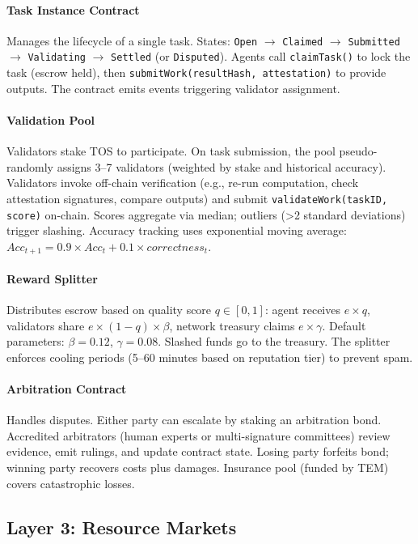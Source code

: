 \documentclass[11pt]{article}
\begin{document}
\paragraph{Task Instance Contract} Manages the lifecycle of a single task. States: \texttt{Open} $\rightarrow$ \texttt{Claimed} $\rightarrow$ \texttt{Submitted} $\rightarrow$ \texttt{Validating} $\rightarrow$ \texttt{Settled} (or \texttt{Disputed}). Agents call \texttt{claimTask()} to lock the task (escrow held), then \texttt{submitWork(resultHash, attestation)} to provide outputs. The contract emits events triggering validator assignment.

\paragraph{Validation Pool} Validators stake TOS to participate. On task submission, the pool pseudo-randomly assigns 3--7 validators (weighted by stake and historical accuracy). Validators invoke off-chain verification (e.g., re-run computation, check attestation signatures, compare outputs) and submit \texttt{validateWork(taskID, score)} on-chain. Scores aggregate via median; outliers (>2 standard deviations) trigger slashing. Accuracy tracking uses exponential moving average: $Acc_{t+1} = 0.9 \times Acc_t + 0.1 \times correctness_t$.

\paragraph{Reward Splitter} Distributes escrow based on quality score $q \in [0,1]$: agent receives $e \times q$, validators share $e \times (1-q) \times \beta$, network treasury claims $e \times \gamma$. Default parameters: $\beta=0.12$, $\gamma=0.08$. Slashed funds go to the treasury. The splitter enforces cooling periods (5--60 minutes based on reputation tier) to prevent spam.

\paragraph{Arbitration Contract} Handles disputes. Either party can escalate by staking an arbitration bond. Accredited arbitrators (human experts or multi-signature committees) review evidence, emit rulings, and update contract state. Losing party forfeits bond; winning party recovers costs plus damages. Insurance pool (funded by TEM) covers catastrophic losses.

\subsection{Layer 3: Resource Markets}
\end{document}

